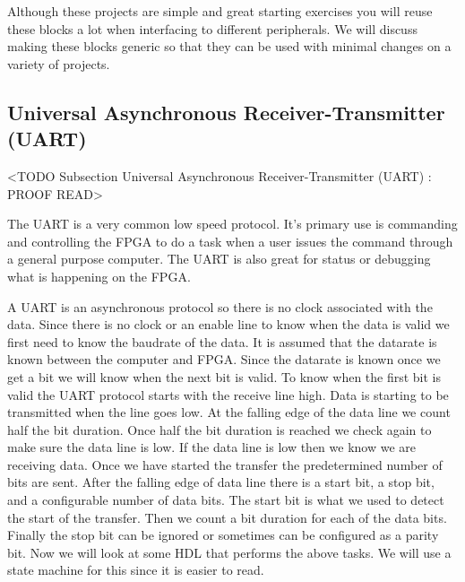 Although these projects are simple and great starting exercises you will reuse these blocks a lot when interfacing to different peripherals. We will discuss making these blocks generic so that they can be used with minimal changes on a variety of projects.

\subsection{Universal Asynchronous Receiver-Transmitter (UART)}
	<TODO Subsection Universal Asynchronous Receiver-Transmitter (UART) : PROOF READ>
	
The \ac{UART} is a very common low speed protocol. It's primary use is commanding and controlling the FPGA to do a task when a user issues the command through a general purpose computer. The \ac{UART} is also great for status or debugging what is happening on the \ac{FPGA}.

A \ac{UART} is an asynchronous protocol so there is no clock associated with the data. Since there is no clock or an enable line to know when the data is valid we first need to know the baudrate of the data. It is assumed that the datarate is known between the computer and \ac{FPGA}. Since the datarate is known once we get a bit we will know when the next bit is valid. To know when the first bit is valid the \ac{UART} protocol starts with the receive line high. Data is starting to be transmitted when the line goes low. At the falling edge of the data line we count half the bit duration. Once half the bit duration is reached we check again to make sure the data line is low. If the data line is low then we know we are receiving data. Once we have started the transfer the predetermined number of bits are sent. After the falling edge of data line there is a start bit, a stop bit, and a configurable number of data bits. The start bit is what we used to detect the start of the transfer. Then we count a bit duration for each of the data bits. Finally the stop bit can be ignored or sometimes can be configured as a parity bit.  Now we will look at some \ac{HDL} that performs the above tasks. We will use a state machine for this since it is easier to read. 

	
	
